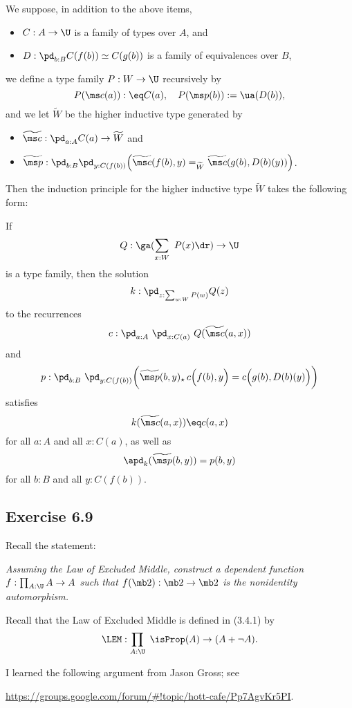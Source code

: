 \documentclass[12pt]{article}
\begin{document}
We suppose, in addition to the above items, 
\begin{itemize}
\item $C:A\to\U$ is a family of types over $A$, and
\item $D:\pd_{b:B}C(f(b))\simeq C(g(b))$ is a family of equivalences over $B$,
\end{itemize}
we define a type family $P:W\to\U$ recursively by
$$
P(\ms c(a)):\eq C(a),\quad P(\ms p(b)):=\ua(D(b)),
$$ 
and we let $\widetilde W$ be the higher inductive type generated by
\begin{itemize}
\item $\widetilde{\ms c}:\pd_{a:A}C(a)\to\widetilde W$ and
\item $\widetilde{\ms p}:\pd_{b:B}\pd_{y:C(f(b))}\Big(\widetilde{\ms c}(f(b),y)=_{\widetilde W}\widetilde{\ms c}(g(b),D(b)(y))\Big)$.
\end{itemize}

Then the induction principle for the higher inductive type $\widetilde W$ takes the following form: 

If 
$$
Q:\ga(\sum_{x:W}\ P(x)\dr)\to\U
$$ 
is a type family, then the solution 
$$
k:\pd_{z:\sum_{w:W}P(w)}Q(z)
$$ 
to the recurrences 
$$
c:\pd_{a:A}\ \pd_{x:C(a)}\ Q(\widetilde{\ms c}(a,x))
$$ 
and
$$
p:\pd_{b:B}\ \pd_{y:C(f(b))}\bigg(\widetilde{\ms p}(b,y)_\star\,c\Big(f(b),y\Big)=c\Big(g(b),D(b)(y)\Big)\bigg)
$$ 
satisfies 
$$
k(\widetilde{\ms c}(a,x))\eq c(a,x)
$$ 
for all $a:A$ and all $x:C(a)$, as well as 
$$
\apd_k(\widetilde{\ms p}(b,y))=p(b,y)
$$ 
for all $b:B$ and all $y:C(f(b))$. 


\subsection{Exercise 6.9}


Recall the statement:

\emph{Assuming the Law of Excluded Middle, construct a dependent function $f:\prod_{A:\U}A\to A$ such that $f(\mb2):\mb2\to\mb2$ is the nonidentity automorphism.}

Recall that the Law of Excluded Middle is defined in (3.4.1) by 
$$
\LEM:\prod_{A:\U}\ \isProp(A)\to(A+\neg A).
$$ 

I learned the following argument from Jason Gross; see 

\nn\href{https://groups.google.com/forum/#!topic/hott-cafe/Pp7AgvKr5PI}{https://groups.google.com/forum/\#!topic/hott-cafe/Pp7AgvKr5PI}.
\end{document}
